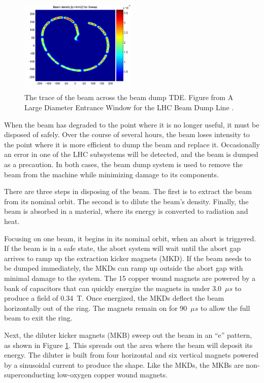 \begin{figure}[h!]
\captionsetup[subfigure]{position=b}
\centering
\includegraphics[width=0.5\textwidth]{figures/experiment/beamdump.png}
\caption{The trace of the beam across the beam dump TDE. Figure from A Large Diameter Entrance Window for the LHC Beam Dump Line \cite{beamdump}.}
\label{fig:beamdump}
\end{figure}

When the beam has degraded to the point where it is no longer useful, it must be disposed of safely.
Over the course of several hours, the beam loses intensity to the point where it is more efficient to dump the beam and replace it.
Occasionally an error in one of the LHC subsystems will be detected, and the beam is dumped as a precaution.
In both cases, the beam dump system is used to remove the beam from the machine while minimizing damage to its components.

There are three steps in disposing of the beam. 
The first is to extract the beam from its nominal orbit.
The second is to dilute the beam's density.
Finally, the beam is absorbed in a material, where its energy is converted to radiation and heat. \cite{lhcDesignV1}

Focusing on one beam, it begins in its nominal orbit, when an abort is triggered. 
If the beam is in a safe state, the abort system will wait until the abort gap arrives to ramp up the extraction kicker magnets (MKD).
If the beam needs to be dumped immediately, the MKDs can ramp up outside the abort gap with minimal damage to the system.
The 15 copper wound magnets are powered by a bank of capacitors that can quickly energize the magnets in under 3.0~$\mu s$ to produce a field of 0.34~T. 
Once energized, the MKDs deflect the beam horizontally out of the ring.
The magnets remain on for 90~$\mu s$ to allow the full beam to exit the ring.

Next, the diluter kicker magnets (MKB) sweep out the beam in an ``e'' pattern, as shown in Figure \ref{fig:beamdump}.
This spreads out the area where the beam will deposit its energy.
The diluter is built from four horizontal and six vertical magnets powered by a sinusoidal current to produce the shape.
Like the MKDs, the MKBs are non-superconducting low-oxygen copper wound magnets.

